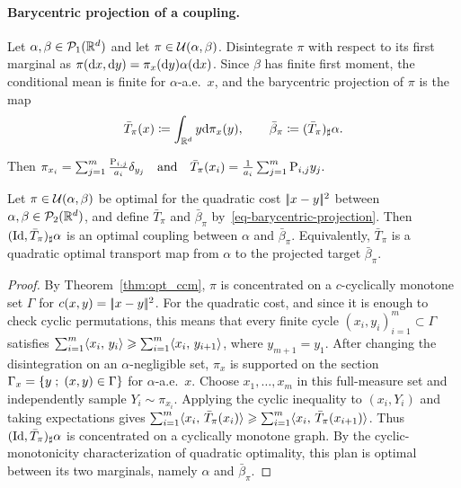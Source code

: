 \paragraph{Barycentric projection of a coupling.}
\begin{defn}\label{def-barycentric-projection}
Let $\alpha,\beta\in\mathcal{P}_1(\mathbb{R}^d)$ and let $\pi\in\mathcal{U}(\alpha,\beta)$. Disintegrate $\pi$ with respect to its first marginal as
$\pi(\mathrm{d} x,\mathrm{d} y)=\pi_x(\mathrm{d} y)\alpha(\mathrm{d} x)$. Since $\beta$ has finite first moment, the conditional mean is finite for $\alpha$-a.e.\ $x$, and the barycentric projection of $\pi$ is the map
\begin{equation}\label{eq-barycentric-projection}
\bar T_\pi(x)
\coloneqq
\int_{\mathbb{R}^d}y\mathrm{d}\pi_x(y),
\qquad
\bar\beta_\pi
\coloneqq
(\bar T_\pi)_\sharp\alpha.
\end{equation}
\end{defn}
Then
\(\pi_{x_i}=\sum_{j=1}^m\frac{\mathrm{P}_{i,j}}{a_i}\delta_{y_j} \quad \text{and} \quad \bar T_\pi(x_i)=\frac{1}{a_i}\sum_{j=1}^m\mathrm{P}_{i,j}y_j.\)
\begin{prop}\label{prop-barycentric-projection-optimal}
Let $\pi\in\mathcal{U}(\alpha,\beta)$ be optimal for the quadratic cost $|\!| x-y |\!|^2$ between $\alpha,\beta\in\mathcal{P}_2(\mathbb{R}^d)$, and define $\bar T_\pi$ and $\bar\beta_\pi$ by~\eqref{eq-barycentric-projection}. Then $(\mathrm{Id},\bar T_\pi)_\sharp\alpha$ is an optimal coupling between $\alpha$ and $\bar\beta_\pi$. Equivalently, $\bar T_\pi$ is a quadratic optimal transport map from $\alpha$ to the projected target $\bar\beta_\pi$.
\end{prop}
\begin{proof}
By Theorem~\ref{thm:opt_ccm}, $\pi$ is concentrated on a $c$-cyclically monotone set $\Gamma$ for $c(x,y)=|\!| x-y |\!|^2$. For the quadratic cost, and since it is enough to check cyclic permutations, this means that every finite cycle $(x_i,y_i)_{i=1}^m\subset\Gamma$ satisfies
$\sum_{i=1}^m \langle x_i,\,y_i\rangle \geqslant \sum_{i=1}^m \langle x_i,\,y_{i+1}\rangle$, where $y_{m+1}=y_1$.
After changing the disintegration on an $\alpha$-negligible set, $\pi_x$ is supported on the section
\(\Gamma_x=\left\{ y \;;\; (x,y)\in\Gamma \right\}\)
for $\alpha$-a.e.\ $x$.
Choose $x_1,\ldots,x_m$ in this full-measure set and independently sample $Y_i\sim\pi_{x_i}$. Applying the cyclic inequality to $(x_i,Y_i)$ and taking expectations gives
$\sum_{i=1}^m \langle x_i,\,\bar T_\pi(x_i)\rangle \geqslant \sum_{i=1}^m \langle x_i,\,\bar T_\pi(x_{i+1})\rangle$.
Thus $(\mathrm{Id},\bar T_\pi)_\sharp\alpha$ is concentrated on a cyclically monotone graph. By the cyclic-monotonicity characterization of quadratic optimality, this plan is optimal between its two marginals, namely $\alpha$ and $\bar\beta_\pi$.
\end{proof}
